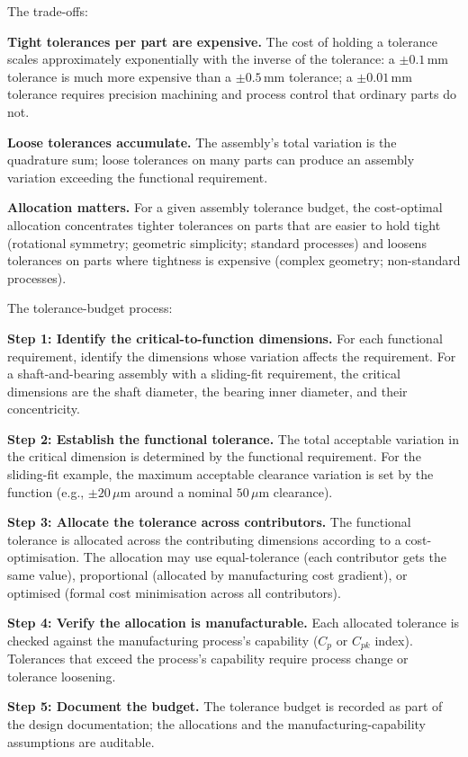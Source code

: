 The trade-offs:

\textbf{Tight tolerances per part are expensive.} The cost of holding a tolerance scales approximately exponentially with the inverse of the tolerance: a $\pm 0.1\,\text{mm}$ tolerance is much more expensive than a $\pm 0.5\,\text{mm}$ tolerance; a $\pm 0.01\,\text{mm}$ tolerance requires precision machining and process control that ordinary parts do not.

\textbf{Loose tolerances accumulate.} The assembly's total variation is the quadrature sum; loose tolerances on many parts can produce an assembly variation exceeding the functional requirement.

\textbf{Allocation matters.} For a given assembly tolerance budget, the cost-optimal allocation concentrates tighter tolerances on parts that are easier to hold tight (rotational symmetry; geometric simplicity; standard processes) and loosens tolerances on parts where tightness is expensive (complex geometry; non-standard processes).

The tolerance-budget process:

\textbf{Step 1: Identify the critical-to-function dimensions.} For each functional requirement, identify the dimensions whose variation affects the requirement. For a shaft-and-bearing assembly with a sliding-fit requirement, the critical dimensions are the shaft diameter, the bearing inner diameter, and their concentricity.

\textbf{Step 2: Establish the functional tolerance.} The total acceptable variation in the critical dimension is determined by the functional requirement. For the sliding-fit example, the maximum acceptable clearance variation is set by the function (e.g., $\pm 20\,\mu\text{m}$ around a nominal $50\,\mu\text{m}$ clearance).

\textbf{Step 3: Allocate the tolerance across contributors.} The functional tolerance is allocated across the contributing dimensions according to a cost-optimisation. The allocation may use equal-tolerance (each contributor gets the same value), proportional (allocated by manufacturing cost gradient), or optimised (formal cost minimisation across all contributors).

\textbf{Step 4: Verify the allocation is manufacturable.} Each allocated tolerance is checked against the manufacturing process's capability ($C_p$ or $C_{pk}$ index). Tolerances that exceed the process's capability require process change or tolerance loosening.

\textbf{Step 5: Document the budget.} The tolerance budget is recorded as part of the design documentation; the allocations and the manufacturing-capability assumptions are auditable.


